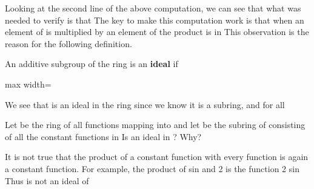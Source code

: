 \documentclass[11pt,oneside]{article}
\begin{document}
\BookNarrativetrue

\begin{BookBody}

\noindent Looking at the second line of the above computation, we can see that what was needed to verify  is that  The key to make this computation work is that when an element of  is multiplied by an element of  the product is in  This observation is the reason for the following definition.

 An additive subgroup  of the ring  is an\textbf{ ideal} if

\begin{center}\begin{adjustbox}{max width=\linewidth}\end{adjustbox}\end{center} \BookEnd{\blacksquare}

 We see that  is an ideal in the ring  since we know it is a subring, and   for all \BookEnd{\blacktriangle}

 Let  be the ring of all functions mapping  into  and let  be the subring of  consisting of all the constant functions in  Is  an ideal in ? Why?

 It is not true that the product of a constant function with every function is again a constant function. For example, the product of sin  and 2 is the function 2 sin  Thus  is not an ideal of \BookEnd{\blacktriangle}



\end{BookBody}
\end{document}
